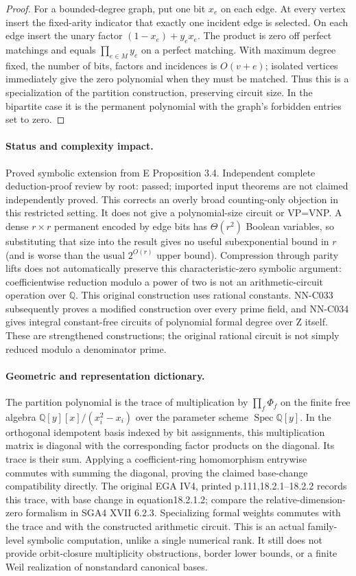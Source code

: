 \begin{proof}
For a bounded-degree graph, put one bit $x_e$ on each edge. At every vertex insert the fixed-arity indicator that exactly one incident edge is selected. On each edge insert the unary factor $(1-x_e)+y_e x_e$. The product is zero off perfect matchings and equals $\prod_{e\in M}y_e$ on a perfect matching. With maximum degree fixed, the number of bits, factors and incidences is $O(v+e)$; isolated vertices immediately give the zero polynomial when they must be matched. Thus this is a specialization of the partition construction, preserving circuit size. In the bipartite case it is the permanent polynomial with the graph's forbidden entries set to zero.
\end{proof}
\paragraph{Status and complexity impact.}
Proved symbolic extension from E Proposition 3.4. Independent complete deduction-proof review by root: passed; imported input theorems are not claimed independently proved. This corrects an overly broad counting-only objection in this restricted setting. It does not give a polynomial-size circuit or VP=VNP. A dense $r\times r$ permanent encoded by edge bits has $\Theta(r^2)$ Boolean variables, so substituting that size into the result gives no useful subexponential bound in $r$ (and is worse than the usual $2^{O(r)}$ upper bound). Compression through parity lifts does not automatically preserve this characteristic-zero symbolic argument: coefficientwise reduction modulo a power of two is not an arithmetic-circuit operation over $\mathbb Q$. This original construction uses rational constants. NN-C033 subsequently proves a modified construction over every prime field, and NN-C034 gives integral constant-free circuits of polynomial formal degree over Z itself. These are strengthened constructions; the original rational circuit is not simply reduced modulo a denominator prime.

\paragraph{Geometric and representation dictionary.}
The partition polynomial is the trace of multiplication by $\prod_f\Phi_f$ on the finite free algebra $\mathbb Q[y][x]/(x_i^2-x_i)$ over the parameter scheme $\operatorname{Spec}\mathbb Q[y]$. In the orthogonal idempotent basis indexed by bit assignments, this multiplication matrix is diagonal with the corresponding factor products on the diagonal. Its trace is their sum. Applying a coefficient-ring homomorphism entrywise commutes with summing the diagonal, proving the claimed base-change compatibility directly. The original EGA IV4, printed p.111,18.2.1--18.2.2 records this trace, with base change in equation18.2.1.2; compare the relative-dimension-zero formalism in SGA4 XVII 6.2.3. Specializing formal weights commutes with the trace and with the constructed arithmetic circuit. This is an actual family-level symbolic computation, unlike a single numerical rank. It still does not provide orbit-closure multiplicity obstructions, border lower bounds, or a finite Weil realization of nonstandard canonical bases.



